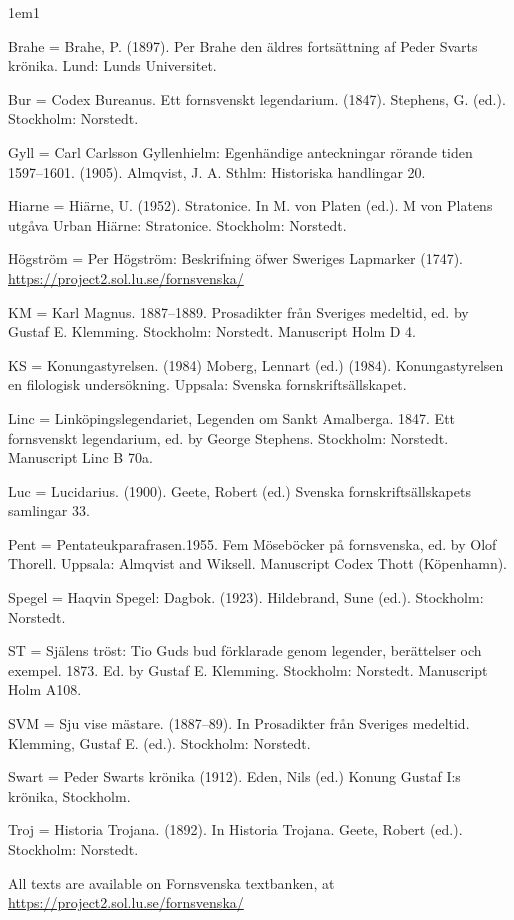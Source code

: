 \documentclass[output=paper,colorlinks,citecolor=brown]{langscibook}
\begin{document}
\begin{hangparas}{1em}{1}

Brahe = Brahe, P. (1897). Per Brahe den äldres fortsättning af Peder Svarts krönika. Lund: Lunds Universitet.

Bur = Codex Bureanus. Ett fornsvenskt legendarium. (1847). Stephens, G. (ed.). Stockholm: Norstedt.

Gyll = Carl Carlsson Gyllenhielm: Egenhändige anteckningar rörande tiden 1597--1601. (1905). Almqvist, J. A. Sthlm: Historiska handlingar 20.

Hiarne = Hiärne, U. (1952). Stratonice. In M. von Platen (ed.). M von Platens utgåva Urban Hiärne: Stratonice. Stockholm: Norstedt.

Högström = Per Högström: Beskrifning öfwer Sweriges Lapmarker (1747). \url{https://project2.sol.lu.se/fornsvenska/} 

KM = Karl Magnus. 1887–1889. Prosadikter från Sveriges medeltid, ed. by Gustaf E. Klemming. Stockholm: Norstedt. Manuscript Holm D 4.

KS = Konungastyrelsen. (1984) Moberg, Lennart (ed.) (1984). Konungastyrelsen en filologisk undersökning. Uppsala: Svenska fornskriftsällskapet.

Linc = Linköpingslegendariet, Legenden om Sankt Amalberga. 1847. Ett fornsvenskt legendarium, ed. by George Stephens. Stockholm: Norstedt. Manuscript Linc B 70a.

Luc = Lucidarius. (1900). Geete, Robert (ed.) Svenska fornskriftsällskapets samlingar 33.

Pent = Pentateukparafrasen.1955. Fem Möseböcker på fornsvenska, ed. by Olof Thorell. Uppsala: Almqvist and Wiksell. Manuscript Codex Thott (Köpenhamn).

Spegel = Haqvin Spegel: Dagbok. (1923). Hildebrand, Sune (ed.). Stockholm: Norstedt.

ST = Själens tröst: Tio Guds bud förklarade genom legender, berättelser och exempel. 1873. Ed. by Gustaf E. Klemming. Stockholm: Norstedt. Manuscript Holm A108.

SVM = Sju vise mästare. (1887–89). In Prosadikter från Sveriges medeltid. Klemming, Gustaf E. (ed.). Stockholm: Norstedt.

Swart = Peder Swarts krönika (1912). Eden, Nils (ed.) Konung Gustaf I:s krönika, Stockholm.

Troj = Historia Trojana. (1892). In Historia Trojana. Geete, Robert (ed.). Stockholm: Norstedt.

All texts are available on Fornsvenska textbanken, at \url{https://project2.sol.lu.se/fornsvenska/}

\end{hangparas}




\sloppy
\printbibliography[heading=subbibliography,notkeyword=this]
\end{document}
